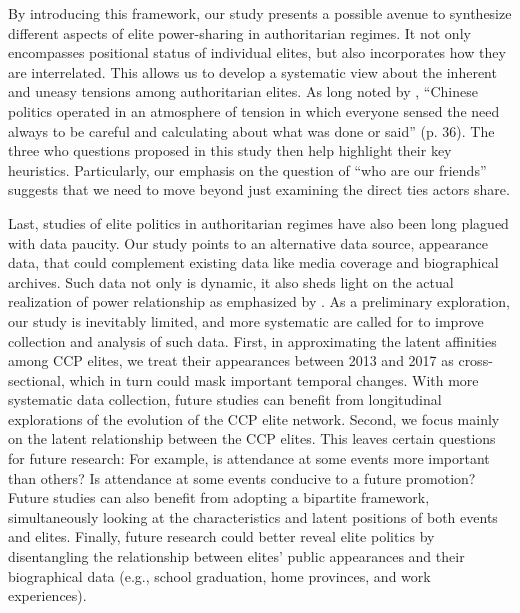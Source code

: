 \documentclass[11pt,english]{article}
\begin{document}
\begin{flushleft}
By introducing this framework, our study presents a possible avenue to synthesize different aspects of elite power-sharing in authoritarian regimes. It not only encompasses positional status of individual elites, but also incorporates how they are interrelated. This allows us to develop a systematic view about the inherent and uneasy tensions among authoritarian elites. As long noted by \citet{Pye1995}, ``Chinese politics operated in an atmosphere of tension in which everyone sensed the need always to be careful and calculating about what was done or said'' (p. 36). The three who questions proposed in this study then help highlight their key heuristics. Particularly, our emphasis on the question of ``who are our friends'' suggests that we need to move beyond just examining the direct ties actors share.

Last, studies of elite politics in authoritarian regimes have also been long plagued with data paucity. Our study points to an alternative data source, appearance data, that could complement existing data like media coverage and biographical archives. Such data not only is dynamic, it also sheds light on the actual realization of power relationship as emphasized by \citet{Dahl1961}. As a preliminary exploration, our study is inevitably limited, and more systematic are called for to improve collection and analysis of such data.  First, in approximating the latent affinities among CCP elites, we treat their appearances between 2013 and 2017 as cross-sectional, which in turn could mask important temporal changes.  With more systematic data collection, future studies can benefit from longitudinal explorations of the evolution of the CCP elite network.  Second, we focus mainly on the latent relationship between the CCP elites.  This leaves certain questions for future research:  For example, is attendance at some events more important than others?  Is attendance at some events conducive to a future promotion?  Future studies can also benefit from adopting a bipartite framework, simultaneously looking at the characteristics and latent positions of both events and elites.  Finally, future research could better reveal elite politics by disentangling the relationship between elites' public appearances and their biographical data (e.g., school graduation, home provinces, and work experiences). 

\newpage{}

\begin{spacing}{1}




\end{spacing}

\par\end{flushleft}
\end{document}
